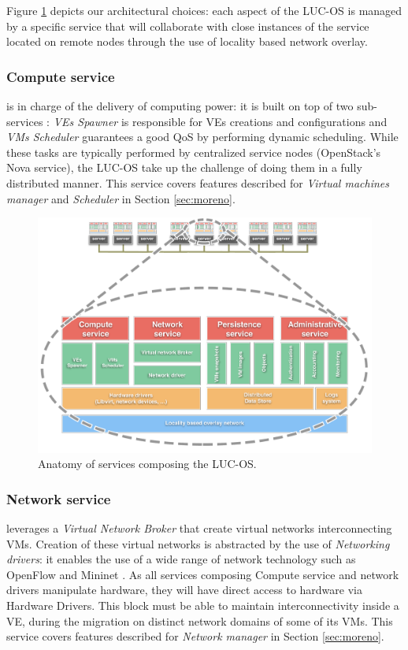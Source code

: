 \label{sec:anatomy_lucos}
Figure \ref{fig:anatomy} depicts our architectural choices: each aspect of the 
LUC-OS is managed by a specific service that will collaborate with close 
instances of the service located on remote nodes through the use of locality
based network overlay. 

\subsubsection{Compute service}
is in charge of the delivery of computing power: it is built on top of two 
sub-services : \emph{VEs Spawner} is responsible for VEs creations and 
configurations and \emph{VMs Scheduler} guarantees a good QoS by performing 
dynamic scheduling. While these tasks are typically performed by centralized 
service nodes (OpenStack's Nova service), the LUC-OS take up the challenge of 
doing them in a fully distributed manner. This service covers features described
for \emph{Virtual machines manager} and \emph{Scheduler} in Section 
\ref{sec:moreno}.

\begin{figure}
  \centerline{
   \includegraphics[width=1.55\linewidth]{Figures/lucos_agents.pdf}
  }
  \caption{Anatomy of services composing the LUC-OS.}%
  \label{fig:anatomy}%
\end{figure}

\subsubsection{Network service} 
leverages a \emph{Virtual Network Broker} that create virtual networks 
interconnecting VMs. Creation of these virtual networks is abstracted by the use
of \emph{Networking drivers}: it enables the use of a wide range of network 
technology such as OpenFlow \cite{McKeown:2008:OEI:1355734.1355746} and Mininet
\cite{Lantz:2010:NLR:1868447.1868466}. As all services composing Compute 
service and network drivers manipulate hardware, they will have direct access to
hardware via Hardware Drivers. This block must be able to maintain 
interconnectivity inside a VE, during the migration on distinct network domains 
of some of its VMs. This service covers features described for \emph{Network 
manager} in Section \ref{sec:moreno}.

